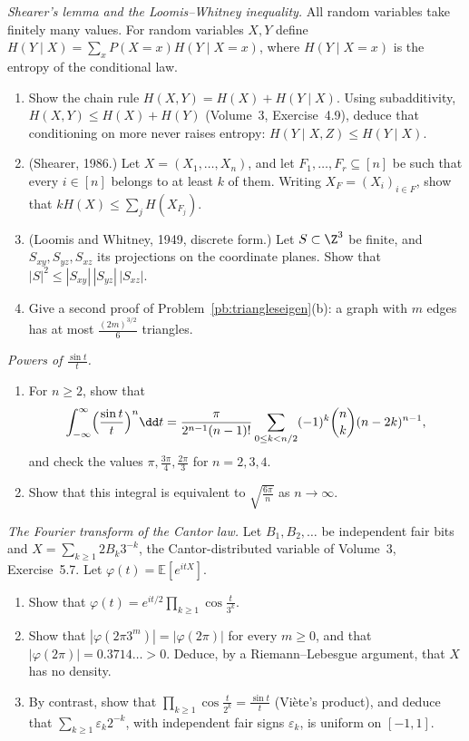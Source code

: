 \begin{exercise}[Journey]\label{pb:shearer}
\emph{Shearer's lemma and the Loomis--Whitney inequality.} All random variables take finitely many values. For random variables
$X,Y$ define $H(Y\mid X)=\sum_xP(X=x)H(Y\mid X=x)$, where $H(Y\mid X=x)$ is the entropy of the conditional law.
\begin{enumerate}[label=(\alph*)]
\item Show the chain rule $H(X,Y)=H(X)+H(Y\mid X)$. Using subadditivity, $H(X,Y)\le H(X)+H(Y)$ (Volume~3, Exercise~4.9), deduce that
conditioning on more never raises entropy: $H(Y\mid X,Z)\le H(Y\mid X)$.
\item (Shearer, 1986.) Let $X=(X_1,\dots,X_n)$, and let $F_1,\dots,F_r\subseteq[n]$ be such that every $i\in[n]$ belongs to at least $k$ of them.
Writing $X_F=(X_i)_{i\in F}$, show that $kH(X)\le\sum_jH(X_{F_j})$.
\item (Loomis and Whitney, 1949, discrete form.) Let $S\subset\Z^3$ be finite, and $S_{xy},S_{yz},S_{xz}$ its projections on the coordinate
planes. Show that $|S|^2\le|S_{xy}|\,|S_{yz}|\,|S_{xz}|$.
\item Give a second proof of Problem~\ref{pb:triangleseigen}(b): a graph with $m$ edges has at most $\frac{(2m)^{3/2}}6$ triangles.
\end{enumerate}
\end{exercise}

\begin{exercise}[$\star\star$]\label{pb:sincpower}
\emph{Powers of $\frac{\sin t}t$.}
\begin{enumerate}[label=(\alph*)]
\item For $n\ge2$, show that
\[
\int_{-\infty}^\infty\Bigl(\frac{\sin t}t\Bigr)^n\dd t=\frac\pi{2^{n-1}(n-1)!}\sum_{0\le k<n/2}(-1)^k\binom nk(n-2k)^{n-1},
\]
and check the values $\pi,\frac{3\pi}4,\frac{2\pi}3$ for $n=2,3,4$.
\item Show that this integral is equivalent to $\sqrt{\frac{6\pi}n}$ as $n\to\infty$.
\end{enumerate}
\end{exercise}

\begin{exercise}[$\star\star$]\label{pb:cantor}
\emph{The Fourier transform of the Cantor law.} Let $B_1,B_2,\dots$ be independent fair bits and $X=\sum_{k\ge1}2B_k3^{-k}$, the
Cantor-distributed variable of Volume~3, Exercise~5.7. Let $\varphi(t)=\mathbb E[e^{itX}]$.
\begin{enumerate}[label=(\alph*)]
\item Show that $\varphi(t)=e^{it/2}\prod_{k\ge1}\cos\frac t{3^k}$.
\item Show that $|\varphi(2\pi3^m)|=|\varphi(2\pi)|$ for every $m\ge0$, and that $|\varphi(2\pi)|=0.3714\ldots>0$. Deduce, by a
Riemann--Lebesgue argument, that $X$ has no density.
\item By contrast, show that $\prod_{k\ge1}\cos\frac t{2^k}=\frac{\sin t}t$ (Viète's product), and deduce that $\sum_{k\ge1}\varepsilon_k2^{-k}$, with
independent fair signs $\varepsilon_k$, is uniform on $[-1,1]$.
\end{enumerate}
\end{exercise}

